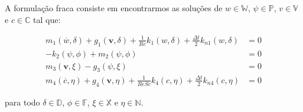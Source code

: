 \noindent
A formulação fraca consiste em
encontrarmos as soluções de $w \in \mathbb{W}$,
$\psi \in \mathbb{P}$, $v \in \mathbb{V}$ e $c \in \mathbb{C}$
tal que:

\begin{align}
 \textbf{$m_1$}(\overset{.}{w},\delta) + \textbf{$g_1$}(\textbf{v},\delta) 
 + \frac{1}{\textit{Re}}\textbf{$k_1$}(w,\delta) + \frac{\Delta t}{2} \textbf{$k_{n1}$}(w,\delta) &= 0 \\
 -\textbf{$k_2$}(\psi,\phi) + \textbf{$m_2$}(\psi,\phi) &= 0 \\
  \textbf{$m_3$}(\textbf{v},\xi) - \textbf{$g_3$}(\psi,\xi) &= 0 \\
 \textbf{$m_4$}(\overset{.}{c},\eta) + \textbf{$g_4$}(\textbf{v},\eta) 
 + \frac{1}{\textit{ReSc}}\textbf{$k_4$}(c,\eta) +\frac{\Delta t}{2} \textbf{$k_{n4}$}(c,\eta) &= 0
\end{align}


\noindent
para todo $\delta \in \mathbb{D}$, $\phi \in \mathbb{F}$, 
$\xi \in \mathbb{X}$ e $\eta \in \mathbb{N}$.
